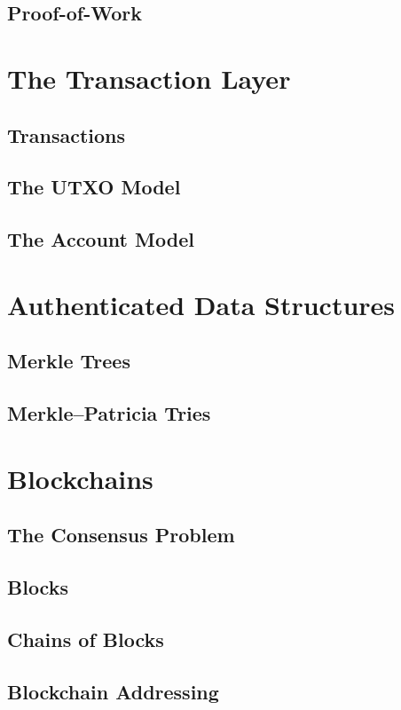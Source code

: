 \subsection{Proof-of-Work}


\section{The Transaction Layer}
\subsection{Transactions}
\subsection{The UTXO Model}
\subsection{The Account Model}

\section{Authenticated Data Structures}
\subsection{Merkle Trees}
\subsection{Merkle–Patricia Tries}

\section{Blockchains}
\subsection{The Consensus Problem}
\subsection{Blocks}
\subsection{Chains of Blocks}
\subsection{Blockchain Addressing}
